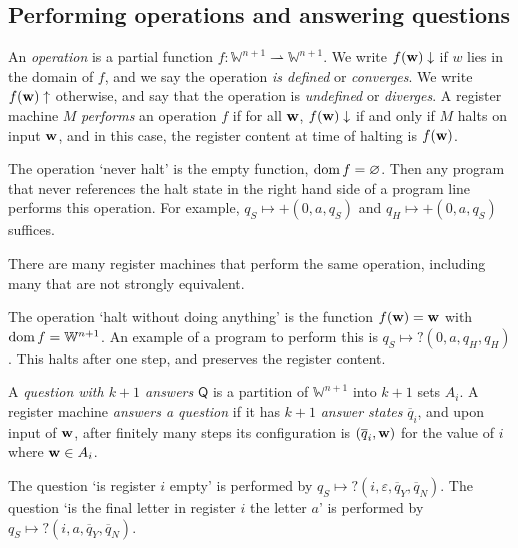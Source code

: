 \subsection{Performing operations and answering questions}
\begin{definition}
	An \emph{operation} is a partial function \( f \colon \mathbb W^{n+1} \rightharpoonup \mathbb W^{n+1} \).
	We write \( f(\vb w) \downarrow \) if \( w \) lies in the domain of \( f \), and we say the operation \emph{is defined} or \emph{converges}.
	We write \( f(\vb w) \uparrow \) otherwise, and say that the operation is \emph{undefined} or \emph{diverges}.
	A register machine \( M \) \emph{performs} an operation \( f \) if for all \( \vb w \), \( f(\vb w) \downarrow \) if and only if \( M \) halts on input \( \vb w \), and in this case, the register content at time of halting is \( f(\vb w) \).
\end{definition}
\begin{example}
	The operation `never halt' is the empty function, \( \operatorname{dom} f = \varnothing \).
	Then any program that never references the halt state in the right hand side of a program line performs this operation.
	For example, \( q_S \mapsto +(0,a,q_S) \) and \( q_H \mapsto +(0,a,q_S) \) suffices.
\end{example}
\begin{remark}
	There are many register machines that perform the same operation, including many that are not strongly equivalent.
\end{remark}
\begin{example}
	The operation `halt without doing anything' is the function \( f(\vb w) = \vb w \) with \( \operatorname{dom} f = \mathbb W^{n+1} \).
	An example of a program to perform this is \( q_S \mapsto ?(0,a,q_H,q_H) \).
	This halts after one step, and preserves the register content.
\end{example}
\begin{definition}
	A \emph{question with \( k+1 \) answers} \( \mathsf Q \) is a partition of \( \mathbb W^{n+1} \) into \( k + 1 \) sets \( A_i \).
	A register machine \emph{answers a question} if it has \( k + 1 \) \emph{answer states} \( \overline q_i \), and upon input of \( \vb w \), after finitely many steps its configuration is \( (\overline q_i, \vb w) \) for the value of \( i \) where \( \vb w \in A_i \).
\end{definition}
\begin{example}
	The question `is register \( i \) empty' is performed by \( q_S \mapsto ?(i, \varepsilon, \overline q_Y, \overline q_N) \).
	The question `is the final letter in register \( i \) the letter \( a \)' is performed by \( q_S \mapsto ?(i, a, \overline q_Y, \overline q_N) \).
\end{example}
